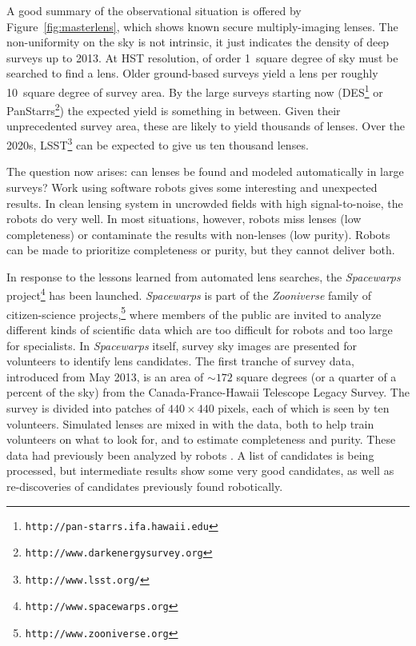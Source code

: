 A good summary of the observational situation is offered by
Figure~\ref{fig:masterlens}, which shows known secure multiply-imaging
lenses.  The non-uniformity on the sky is not intrinsic, it just
indicates the density of deep surveys up to 2013.  At HST resolution,
of order 1~square degree of sky must be searched to find a lens.
Older ground-based surveys yield a lens per roughly 10~square degree
of survey area.  By the large surveys starting now
(DES\footnote{\tt http://pan-starrs.ifa.hawaii.edu} or
PanStarrs\footnote{\tt http://www.darkenergysurvey.org}) the expected
yield is something in between.  Given their unprecedented survey area,
these are likely to yield thousands of lenses.  Over the 2020s,
LSST\footnote{\tt http://www.lsst.org/} can be expected to give us ten
thousand lenses.

The question now arises: can lenses be found and modeled
automatically in large surveys?  Work using software robots
\citep{2009ApJ...694..924M} gives some interesting and unexpected
results.  In clean lensing system in uncrowded fields with high
signal-to-noise, the robots do very well.  In most situations,
however, robots miss lenses (low completeness) or contaminate the
results with non-lenses (low purity).  Robots can be made to
prioritize completeness or purity, but they cannot deliver both.

In response to the lessons learned from automated lens searches, the
{\em Spacewarps\/} project\footnote{\tt http://www.spacewarps.org}
 has been launched.  {\em Spacewarps\/} is
part of the {\em Zooniverse\/} family of citizen-science
projects,\footnote{\tt http://www.zooniverse.org} where members of the
public are invited to analyze different kinds of scientific data which
are too difficult for robots and too large for specialists.  In {\em
 Spacewarps\/} itself, survey sky images are presented for volunteers to identify lens candidates.  The first tranche of survey data, introduced from May 2013, is an area of $\sim172$ square
degrees (or a quarter of a percent of the sky) from the Canada-France-Hawaii Telescope Legacy Survey.
 The survey is divided into patches of $440\times 440$ pixels, each of
which is seen by ten volunteers.  Simulated lenses are mixed in with
the data, both to help train volunteers on what to look for, and to
estimate completeness and purity.
These data had previously been analyzed by robots \cite{Gavazzi2012, More2012ApJ}.  
  A list of candidates is being
processed, but intermediate results show some very good candidates, as
well as re-discoveries of candidates previously found robotically.

